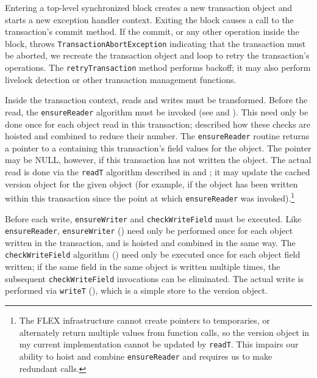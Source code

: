 Entering a top-level synchronized block creates a new transaction
object and starts a new exception handler context.  Exiting the block
causes a call to the transaction's commit method.  If the commit, or
any other operation inside the block, throws
\texttt{TransactionAbortException} indicating that the transaction
must be aborted, we recreate the transaction object and loop to retry
the transaction's operations.  The \texttt{retryTransaction} method
performs backoff; it may also perform livelock detection or other
transaction management functions.

Inside the transaction context, reads and writes must be transformed.
Before the read, the \texttt{ensureReader} algorithm
must be invoked (see  and ).  This
need only be done once for each object read in this transaction;
 described how these checks are hoisted and combined to
reduce their number.  The \texttt{ensureReader} routine returns a
pointer to a  containing this transaction's field
values for the object.  The pointer may be NULL, however, if this
transaction has not written the object.
The actual read is done via the \texttt{readT}
algorithm described in  and ; it may
update the cached version object for the given object (for example, if
the object has been written within this transaction since the point at
which \texttt{ensureReader} was invoked).\footnote{The FLEX
  infrastructure cannot create pointers to temporaries, or
  alternately return multiple values from function calls, so the
  version object in my current implementation cannot be updated by
  \texttt{readT}.  This impairs our ability to hoist and combine
  \texttt{ensureReader} and requires us to make redundant calls.}

Before each write, \texttt{ensureWriter} and \texttt{checkWriteField}
must be executed.  Like \texttt{ensureReader}, \texttt{ensureWriter}
() need only be performed once for each object
written in the transaction, and is hoisted and combined in the same
way.  
The \texttt{checkWriteField} algorithm () need
only be executed once for each object field written; if the same field
in the same object is written multiple times, the subsequent
\texttt{checkWriteField} invocations can be eliminated.  The actual
write is performed via \texttt{writeT} (), which is a
simple store to the version object.

